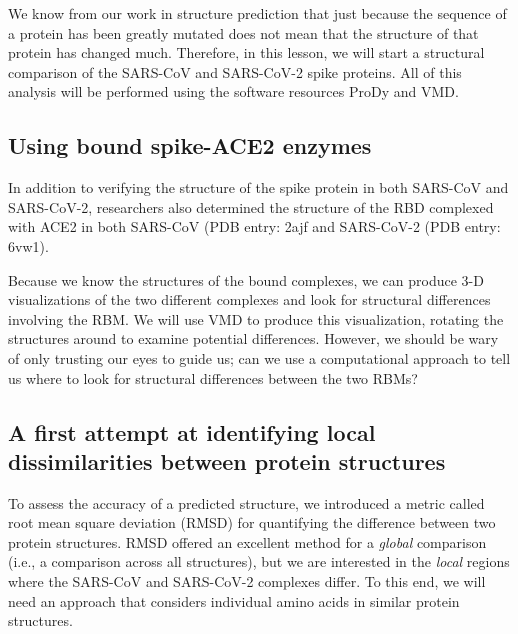 {{We know from our work in structure prediction that just because the sequence of a protein has been greatly mutated does not mean that the structure of that protein has changed much. Therefore, in this lesson, we will start a structural comparison of the SARS-CoV and SARS-CoV-2 spike proteins. All of this analysis will be performed using the software resources ProDy and VMD.

\FloatBarrier
{}
\subsection{Using bound spike-ACE2 enzymes}

In addition to verifying the structure of the spike protein in both SARS-CoV and SARS-CoV-2, researchers also determined the structure of the RBD complexed with ACE2 in both SARS-CoV (PDB entry: 2ajf and SARS-CoV-2 (PDB entry: 6vw1).

\begin{note}\end{note}

Because we know the structures of the bound complexes, we can produce 3-D visualizations of the two different complexes and look for structural differences involving the RBM. We will use VMD to produce this visualization, rotating the structures around to examine potential differences. However, we should be wary of only trusting our eyes to guide us; can we use a computational approach to tell us where to look for structural differences between the two RBMs?

\FloatBarrier
{}
\subsection{A first attempt at identifying local dissimilarities between protein structures}

To assess the accuracy of a predicted structure, we introduced a metric called root mean square deviation (RMSD) for quantifying the difference between two protein structures. RMSD offered an excellent method for a \textit{global} comparison (i.e., a comparison across all structures), but we are interested in the \textit{local} regions where the SARS-CoV and SARS-CoV-2 complexes differ. To this end, we will need an approach that considers individual amino acids in similar protein structures.

}}
